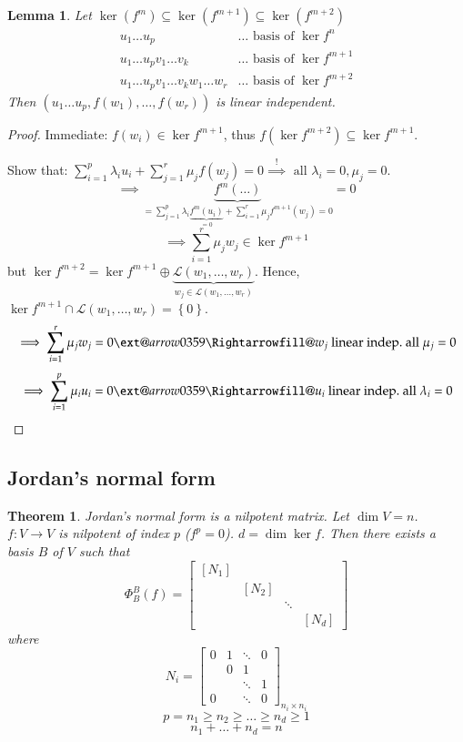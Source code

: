 \documentclass{article}
\makeatletter
\newtheorem{theorem}{Theorem}  \numberwithin{theorem}{section}
\newtheorem{lemma}{Lemma}  \numberwithin{lemma}{section}
\newcommand{\set}[1]{\left\{#1\right\}}
\newcommand{\xRightarrow}[2][]{\ext@arrow 0359\Rightarrowfill@{#1}{#2}}
\makeatother
\begin{document}
\begin{lemma} %
  \label{lemma1117}
  Let $\ker(f^m) \subseteq \ker(f^{m+1}) \subseteq \ker(f^{m+2})$
  \begin{align*}
    u_1 \dots u_p & \dots \text{ basis of } \ker{f^n} \\
    u_1 \dots u_p v_1 \dots v_k & \dots \text{ basis of } \ker{f^{m+1}} \\
    u_1 \dots u_p v_1 \dots v_k w_1 \dots w_r & \dots \text{ basis of } \ker{f^{m+2}}
  \end{align*}
  Then $(u_1 \dots u_p, f(w_1), \dots, f(w_r))$ is linear independent.
\end{lemma}

\begin{proof}
  Immediate: $f(w_i) \in \ker{f^{m+1}}$, thus $f(\ker{f^{m+2}}) \subseteq \ker{f^{m+1}}$.

  Show that: $\sum_{i=1}^p \lambda_i u_i + \sum_{j=1}^r \mu_j f(w_j) = 0 \overset!\implies \text{ all } \lambda_i = 0, \mu_j = 0$.
  \[ \implies \underbrace{f^m(\dots)}_{= \sum_{j=1}^p \lambda_i \underbrace{f^m(u_i)}_{=0} + \sum_{i=1}^r \mu_j f^{m+1}(w_j) = 0} = 0 \]
  \[ \implies \sum_{i=1}^r \mu_j w_j \in \ker{f^{m+1}} \]
  but $\ker{f^{m+2}} = \ker{f^{m+1}} \oplus \underbrace{\mathcal L(w_1, \dots, w_r)}_{w_j \in \mathcal L(w_1, \dots, w_r)}$.
  Hence, $\ker{f^{m+1}} \cap \mathcal L(w_1, \dots, w_r) = \set{0}$.
  \[ \implies \sum_{i=1}^r \mu_j w_j = 0 \xRightarrow{w_j \text{ linear indep.}} \text{ all } \mu_j = 0 \]
  \[ \implies \sum_{i=1}^p \mu_i u_i = 0 \xRightarrow{u_i \text{ linear indep.}} \text{ all } \lambda_i = 0 \]
\end{proof}

\subsection{Jordan's normal form}

\begin{theorem} %
  \label{thm:jnf}
  \emph{Jordan's normal form} is a nilpotent matrix.
  Let $\dim{V} = n$. $f: V \to V$ is nilpotent of index $p$ ($f^p = 0$).
  $d = \dim\ker{f}$.
  Then there exists a basis $B$ of $V$ such that
  \[
    \Phi_B^B(f) = \begin{bmatrix}
      [N_1] &       &        & \\
            & [N_2] &        & \\
            &       & \ddots & \\
            &       &        & [N_d]
    \end{bmatrix}
  \]
  where
  \[ N_i = \begin{bmatrix} 0 & 1 & \ddots & 0 \\  & 0 & 1 & \\ & & \ddots & 1 \\ 0 & & \ddots & 0 \end{bmatrix}_{n_i \times n_i} \]
  \[ p = n_1 \geq n_2 \geq \dots \geq n_d \geq 1 \]
  \[ n_1 + \dots + n_d = n \]
\end{theorem}
\end{document}
